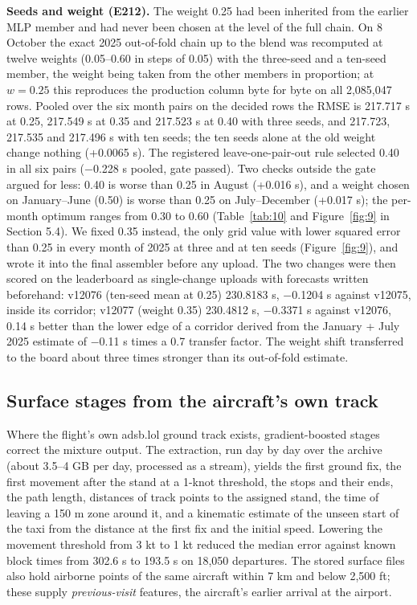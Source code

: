\documentclass[
  manuscript=article,  %
  layout=preprint,     %
  year=2026,
  volume=4,
]{extra/joas}
\begin{document}
\textbf{Seeds and weight (E212).} The weight 0.25 had been inherited from the earlier MLP member and had never been chosen at the level of the full chain. On 8 October the exact 2025 out-of-fold chain up to the blend was recomputed at twelve weights (0.05--0.60 in steps of 0.05) with the three-seed and a ten-seed member, the weight being taken from the other members in proportion; at \(w = 0.25\) this reproduces the production column byte for byte on all 2,085,047 rows. Pooled over the six month pairs on the decided rows the RMSE is 217.717 s at 0.25, 217.549 s at 0.35 and 217.523 s at 0.40 with three seeds, and 217.723, 217.535 and 217.496 s with ten seeds; the ten seeds alone at the old weight change nothing (+0.0065 s). The registered leave-one-pair-out rule selected 0.40 in all six pairs ($-$0.228 s pooled, gate passed). Two checks outside the gate argued for less: 0.40 is worse than 0.25 in August (+0.016 s), and a weight chosen on January--June (0.50) is worse than 0.25 on July--December (+0.017 s); the per-month optimum ranges from 0.30 to 0.60 (Table~\ref{tab:10} and Figure~\ref{fig:9} in Section 5.4). We fixed 0.35 instead, the only grid value with lower squared error than 0.25 in every month of 2025 at three and at ten seeds (Figure~\ref{fig:9}), and wrote it into the final assembler before any upload. The two changes were then scored on the leaderboard as single-change uploads with forecasts written beforehand: v12076 (ten-seed mean at 0.25) 230.8183 s, $-$0.1204 s against v12075, inside its corridor; v12077 (weight 0.35) 230.4812 s, $-$0.3371 s against v12076, 0.14 s better than the lower edge of a corridor derived from the January + July 2025 estimate of $-$0.11 s times a 0.7 transfer factor. The weight shift transferred to the board about three times stronger than its out-of-fold estimate.

\subsection{Surface stages from the aircraft's own track}\label{surface-stages-from-the-aircrafts-own-track}

Where the flight's own adsb.lol ground track exists, gradient-boosted stages correct the mixture output. The extraction, run day by day over the archive (about 3.5--4 GB per day, processed as a stream), yields the first ground fix, the first movement after the stand at a 1-knot threshold, the stops and their ends, the path length, distances of track points to the assigned stand, the time of leaving a 150 m zone around it, and a kinematic estimate of the unseen start of the taxi from the distance at the first fix and the initial speed. Lowering the movement threshold from 3 kt to 1 kt reduced the median error against known block times from 302.6 s to 193.5 s on 18,050 departures. The stored surface files also hold airborne points of the same aircraft within 7 km and below 2,500 ft; these supply \emph{previous-visit} features, the aircraft's earlier arrival at the airport.
\end{document}
